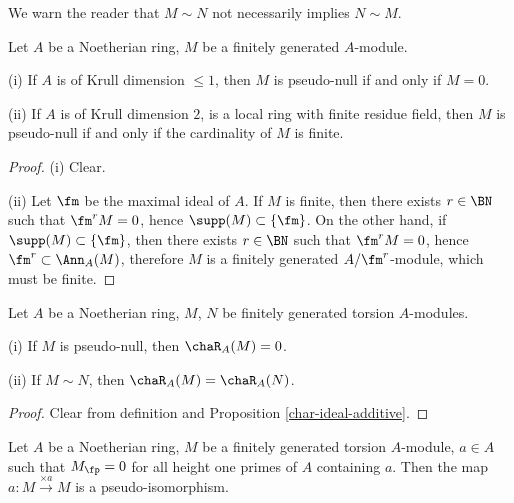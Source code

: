 \begin{remark}
We warn the reader that $M\sim N$ not necessarily implies $N\sim M$.
\end{remark}

\begin{prop}
\label{pseudo-null-criterion}
\leanok
Let $A$ be a Noetherian ring, $M$ be a finitely generated $A$-module.

{\rm(i)} If $A$ is of Krull dimension $\leq 1$, then $M$ is pseudo-null
if and only if $M=0$.

{\rm(ii)} If $A$ is of Krull dimension $2$,
is a local ring with finite residue field, then $M$ is pseudo-null
if and only if the cardinality of $M$ is finite.
\end{prop}

\begin{proof}
\leanok
(i) Clear.

(ii) Let $\fm$ be the maximal ideal of $A$.
If $M$ is finite, then there exists $r\in\BN$
such that $\fm^rM=0$, hence $\supp(M)\subset\{\fm\}$.
On the other hand, if $\supp(M)\subset\{\fm\}$,
then there exists $r\in\BN$
such that $\fm^rM=0$, hence $\fm^r\subset\Ann_A(M)$, therefore
$M$ is a finitely generated $A/\fm^r$-module, which must be finite.
\end{proof}

\begin{prop}
\label{pseudo-null-char-ideal}
\leanok
Let $A$ be a Noetherian ring, $M$, $N$ be finitely generated torsion $A$-modules.

{\rm(i)} If $M$ is pseudo-null, then $\chaR_A(M)=0$.

{\rm(ii)} If $M\sim N$, then $\chaR_A(M)=\chaR_A(N)$.
\end{prop}

\begin{proof}
\leanok
Clear from definition and Proposition \ref{char-ideal-additive}.
\end{proof}

\begin{prop}
\label{smul-is-pis}
\leanok
Let $A$ be a Noetherian ring, $M$ be a finitely generated torsion $A$-module,
$a\in A$ such that $M_\fp=0$ for all height one primes of $A$ containing $a$.
Then the map $a:M\xrightarrow{\times a}M$ is a pseudo-isomorphism.
\end{prop}

